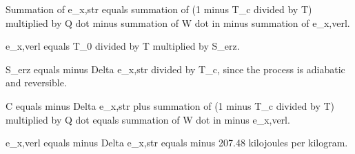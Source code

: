 Summation of e_x,str equals summation of (1 minus T_c divided by T) multiplied by Q dot minus summation of W dot in minus summation of e_x,verl.  

e_x,verl equals T_0 divided by T multiplied by S_erz.  

S_erz equals minus Delta e_x,str divided by T_c, since the process is adiabatic and reversible.  

C equals minus Delta e_x,str plus summation of (1 minus T_c divided by T) multiplied by Q dot equals summation of W dot in minus e_x,verl.  

e_x,verl equals minus Delta e_x,str equals minus 207.48 kilojoules per kilogram.